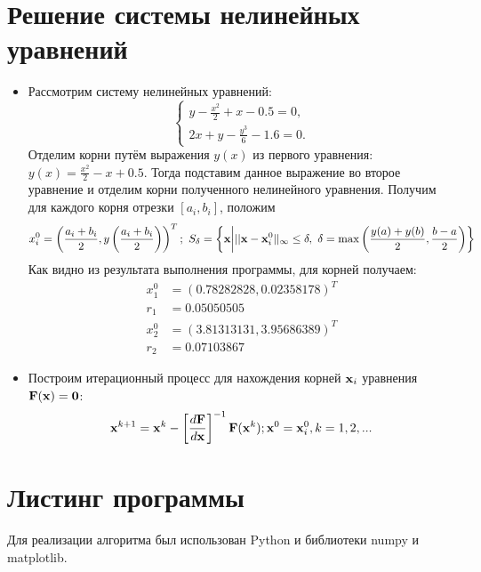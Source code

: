 \documentclass[14pt, a4paper]{article}
\begin{document}
  \section{Решение системы нелинейных уравнений}
  \begin{itemize}
    \item
    Рассмотрим систему нелинейных уравнений:
    $$\begin{cases}y - \frac{x^2}{2} + x - 0.5 = 0, \\ 2x + y - \frac{y^3}{6} - 1.6 = 0.\end{cases}$$
    Отделим корни путём выражения $y(x)$ из первого уравнения: $y(x) = \frac{x^2}{2} - x + 0.5$. Тогда подставим данное выражение во второе уравнение и отделим корни
    полученного нелинейного уравнения. Получим для каждого корня отрезки $[a_i, b_i]$, положим \begin{equation}x_i^0 = \left(\frac{a_i+b_i}{2}, y\left(\frac{a_i+b_i}{2}\right)\right)^T;
    \ S_{\delta} = \left\{ \bold{x} \bigg| ||\bold{x} - \bold{x}_i^0||_{\infty} \leq \delta, \ \delta = \max \left(\frac{y(a) + y(b)}{2}, \frac{b - a}{2} \right) \right\}\end{equation}
    Как видно из результата выполнения программы, для корней получаем:
    \begin{align*}x_1^0 &= \left(0.78282828, 0.02358178\right)^T \\ r_1 &= 0.05050505 \\ x_2^0 &= \left(3.81313131, 3.95686389\right)^T \\ r_2 &= 0.07103867\end{align*}
    \item
    Построим итерационный процесс для нахождения корней $\bold{x}_i$ уравнения $\bold{F}(\bold{x}) = \bold{0}$:
    \begin{equation}\bold{x}^{k+1} = \bold{x}^k - \left[\frac{d\bold{F}}{d\bold{x}}\right]^{-1}\bold{F}(\bold{x}^k); \bold{x}^0 = \bold{x}_i^0, k = 1, 2, ...\end{equation}
  \end{itemize}
  \section{Листинг программы}
  Для реализации алгоритма был использован Python и библиотеки numpy и matplotlib.
\end{document}

